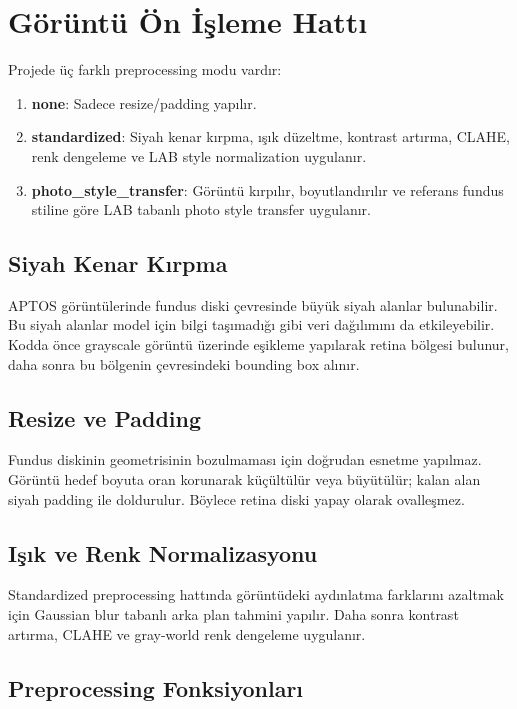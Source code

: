 \documentclass[12pt,a4paper]{article}
\begin{document}
\section{Görüntü Ön İşleme Hattı}

Projede üç farklı preprocessing modu vardır:

\begin{enumerate}
    \item \textbf{none}: Sadece resize/padding yapılır.
    \item \textbf{standardized}: Siyah kenar kırpma, ışık düzeltme, kontrast artırma, CLAHE, renk dengeleme ve LAB style normalization uygulanır.
    \item \textbf{photo\_style\_transfer}: Görüntü kırpılır, boyutlandırılır ve referans fundus stiline göre LAB tabanlı photo style transfer uygulanır.
\end{enumerate}

\subsection{Siyah Kenar Kırpma}

APTOS görüntülerinde fundus diski çevresinde büyük siyah alanlar bulunabilir. Bu siyah alanlar model için bilgi taşımadığı gibi veri dağılımını da etkileyebilir. Kodda önce grayscale görüntü üzerinde eşikleme yapılarak retina bölgesi bulunur, daha sonra bu bölgenin çevresindeki bounding box alınır.

\subsection{Resize ve Padding}

Fundus diskinin geometrisinin bozulmaması için doğrudan esnetme yapılmaz. Görüntü hedef boyuta oran korunarak küçültülür veya büyütülür; kalan alan siyah padding ile doldurulur. Böylece retina diski yapay olarak ovalleşmez.

\subsection{Işık ve Renk Normalizasyonu}

Standardized preprocessing hattında görüntüdeki aydınlatma farklarını azaltmak için Gaussian blur tabanlı arka plan tahmini yapılır. Daha sonra kontrast artırma, CLAHE ve gray-world renk dengeleme uygulanır.

\subsection{Preprocessing Fonksiyonları}
\end{document}
